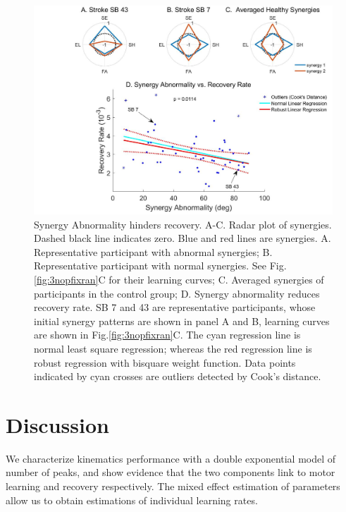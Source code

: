 \begin{figure}
	\centering
	\includegraphics[width=1\linewidth]{figures/6synergy}
	\caption[Synergy Analysis]
	{Synergy Abnormality hinders recovery. 
		A-C. Radar plot of synergies. Dashed black line indicates zero. Blue and red lines are synergies.
		A. Representative participant with abnormal synergies;
		B. Representative participant with normal synergies. See Fig.\ref{fig:3nopfixran}C for their learning curves;
		C. Averaged synergies of participants in the control group;
		D. Synergy abnormality reduces recovery rate. SB 7 and 43 are representative participants, whose initial synergy patterns are shown in panel A and B, learning curves are shown in Fig.\ref{fig:3nopfixran}C.
		The cyan regression line is normal least square regression; whereas the red regression line is robust regression with bisquare weight function. 
		Data points indicated by cyan crosses are outliers detected by Cook's distance.}
	\label{fig:6synergy}
\end{figure}



\section{Discussion}
We characterize kinematics performance with a double exponential model of number of peaks, and show evidence that the two components link to motor learning and recovery respectively. 
The mixed effect estimation of parameters allow us to obtain estimations of individual learning rates.

